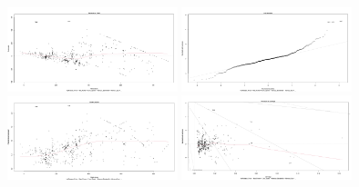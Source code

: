 \documentclass[a4paper]{article}
\begin{document}
            \begin{figure}[H]
                \vspace{-6pt}
                \centering
                \includegraphics[width=0.44\textwidth]{4. GPU/Thống kê suy diễn/Rplot1.png}
                \includegraphics[width=0.44\textwidth]{4. GPU/Thống kê suy diễn/Rplot2.png}
                \includegraphics[width=0.44\textwidth]{4. GPU/Thống kê suy diễn/Rplot3.png}
                \includegraphics[width=0.44\textwidth]{4. GPU/Thống kê suy diễn/Rplot4.png}
            \end{figure}
            \vspace{-5pt}
            \hspace{1pt}
\end{document}
